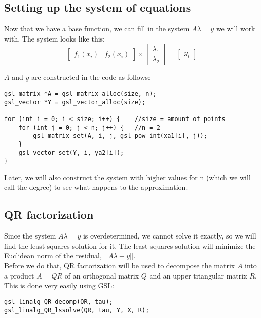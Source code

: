 \documentclass[11pt, a4paper, titlepage, openright]{article}
\begin{document}
    \newpage
    \subsection{Setting up the system of equations}
    Now that we have a base function, we can fill in the system \( A\lambda = y \) we will work with. The system looks like this:
    \[
    \begin{bmatrix} f_1(x_i) & f_2(x_i) \end{bmatrix} 
    \times 
    \left[ \begin{array}{c}  \lambda_1 \\ \lambda_2  \end{array} \right]
    =
    \left[ \begin{array}{c} y_i \end{array} \right]
    \]
    
     \( A \) and \( y \) are constructed in the code as follows:
\begin{lstlisting}
gsl_matrix *A = gsl_matrix_alloc(size, n);
gsl_vector *Y = gsl_vector_alloc(size);

for (int i = 0; i < size; i++) {    //size = amount of points
    for (int j = 0; j < n; j++) {   //n = 2
        gsl_matrix_set(A, i, j, gsl_pow_int(xa1[i], j));
    }
    gsl_vector_set(Y, i, ya2[i]);
}
\end{lstlisting}
    Later, we will also construct the system with higher values for n (which we will call the degree) to see what happens to the approximation.

    \bigskip
    \subsection{QR factorization}
    Since the system \(A \lambda = y \) is overdetermined, we cannot solve it exactly, so we will find the least squares solution for it. 
    The least squares solution will minimize the Euclidean norm of the residual, \(||A\lambda - y||\). \\
    Before we do that, QR factorization will be used to decompose the matrix \( A \) into a product \( A = QR \) 
    of an orthogonal matrix \(Q\) and an upper triangular matrix \(R\). \\
    
    This is done very easily using GSL:
\begin{lstlisting}
gsl_linalg_QR_decomp(QR, tau);
gsl_linalg_QR_lssolve(QR, tau, Y, X, R);
\end{lstlisting}
\end{document}

